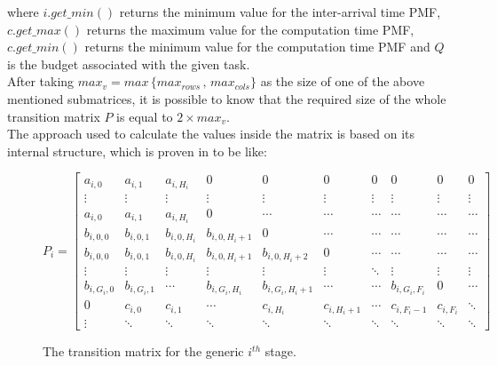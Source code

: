 where \( i.get\_min() \) returns the minimum value for the inter-arrival time PMF, \( c.get\_max() \) returns the maximum value for the computation time PMF, \( c.get\_min() \) returns the minimum value for the computation time PMF and \( Q \) is the budget associated with the given task.\\
After taking \( max_{v} = max\,\{max_{rows}\,,\,max_{cols}\} \) as the size of one of the above mentioned submatrices, it is possible to know that the required size of the whole transition matrix \( P \) is equal to \( 2 \times max_{v} \).\\
The approach used to calculate the values inside the matrix is based on its internal structure, which is proven in \cite{pipelines} to be like:
\begin{figure}[H] \label{matrixstructure}
\begin{equation*} 
  P_{i} = 
  \begin{bmatrix}
    a_{i,0} & a_{i,1} & a_{i,H_{i}} & 0 & 0 & 0 & 0 & 0 & 0 & 0 \\
    \vdots & \vdots & \vdots & \vdots & \vdots & \vdots & \vdots & \vdots & \vdots & \vdots\\
    a_{i,0} & a_{i,1} & a_{i,H_{i}} & 0 & \cdots & \cdots & \cdots & \cdots & \cdots & \cdots \\
    b_{i,0,0} & b_{i,0,1} & b_{i,0,H_{i}} & b_{i,0,H_{i}+1} & 0 & \cdots & \cdots & \cdots & \cdots & \cdots \\
    b_{i,0,0} & b_{i,0,1} & b_{i,0,H_{i}} & b_{i,0,H_{i}+1} & b_{i,0,H_{i}+2} & 0 & \cdots & \cdots & \cdots & \cdots \\
    \vdots & \vdots & \vdots & \vdots & \vdots & \vdots & \ddots & \vdots & \vdots & \vdots \\
    b_{i,G_{i},0} & b_{i,G_{i},1} & \cdots & b_{i,G_{i},H_{i}} & b_{i,G_{i},H_{i}+1} & \cdots & \cdots & b_{i,G_{i},F_{i}} & 0 & \cdots \\
    0 & c_{i,0} & c_{i,1} & \cdots & c_{i,H_{i}} & c_{i,H_{i}+1} & \cdots & c_{i,F_{i}-1} & c_{i,F_{i}} & \ddots \\
    \vdots & \ddots & \ddots & \ddots & \ddots & \ddots & \ddots & \ddots & \ddots & \ddots
  \end{bmatrix}
\end{equation*}
\caption{The transition matrix for the generic \( i^{th} \) stage.}
\end{figure}

